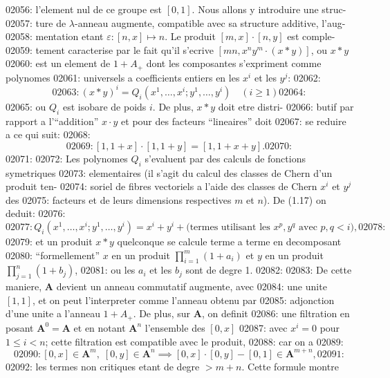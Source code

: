 02056: l'element nul de ce groupe est $[0, 1]$. Nous allons y introduire une struc-
02057: ture de $\lambda$-anneau augmente, compatible avec sa structure additive, l'aug-
02058: mentation etant $\varepsilon: [n, x] \mapsto n$. Le produit $[m, x] \cdot [n, y]$ est comple-
02059: tement caracterise par le fait qu'il s'ecrive $[mn, x^n y^m \cdot (x * y)]$, ou $x * y$
02060: est un element de $1 + A_{+}$ dont les composantes s'expriment comme polynomes
02061: universels a coefficients entiers en les $x^i$ et les $y^j$:
02062: \begin{equation}
02063: (x * y)^i = Q_i(x^1, \ldots, x^i; y^1, \ldots, y^i) \quad (i \geq 1)
02064: \end{equation}
02065: ou $Q_i$ est isobare de poids $i$. De plus, $x * y$ doit etre distri-
02066: butif par rapport a l'``addition'' $x \cdot y$ et pour des facteurs ``lineaires'' doit
02067: se reduire a ce qui suit:
02068: \begin{equation}
02069: [1, 1+x] \cdot [1, 1+y] = [1, 1+x+y].
02070: \end{equation}
02071: 
02072: Les polynomes $Q_i$ s'evaluent par des calculs de fonctions symetriques
02073: elementaires (il s'agit du calcul des classes de Chern d'un produit ten-
02074: soriel de fibres vectoriels a l'aide des classes de Chern $x^i$ et $y^j$ des
02075: facteurs et de leurs dimensions respectives $m$ et $n$). De (1.17) on deduit:
02076: \[
02077: Q_i(x^1, \ldots, x^i; y^1, \ldots, y^i) = x^i + y^i + \text{(termes utilisant les } x^p, y^q \text{ avec } p, q < i\text{)},
02078: \]
02079: et un produit $x * y$ quelconque se calcule terme a terme en decomposant
02080: ``formellement'' $x$ en un produit $\prod_{i=1}^{m} (1+a_i)$ et $y$ en un produit $\prod_{j=1}^{n} (1+b_j)$,
02081: ou les $a_i$ et les $b_j$ sont de degre 1.
02082: 
02083: De cette maniere, $\mathbf{A}$ devient un anneau commutatif augmente, avec
02084: une unite $[1, 1]$, et on peut l'interpreter comme l'anneau obtenu par
02085: adjonction d'une unite a l'anneau $1 + A_{+}$. De plus, sur $\mathbf{A}$, on definit
02086: une filtration en posant $\mathbf{A}^0 = \mathbf{A}$ et en notant $\mathbf{A}^n$ l'ensemble des $[0, x]$
02087: avec $x^i = 0$ pour $1 \leq i < n$; cette filtration est compatible avec le produit,
02088: car on a
02089: \begin{equation}
02090: [0, x] \in \mathbf{A}^m, \; [0, y] \in \mathbf{A}^n \implies [0, x] \cdot [0, y] - [0, 1] \in \mathbf{A}^{m+n},
02091: \end{equation}
02092: les termes non critiques etant de degre $> m+n$. Cette formule montre
